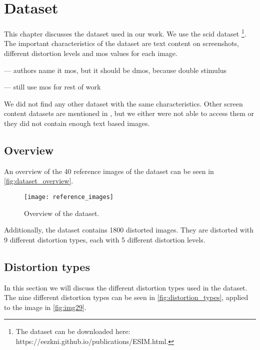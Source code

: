 \chapter{Dataset}
\label{chap:dataset}
This chapter discusses the dataset used in our work. We use the \gls{scid} dataset \cite{ni_esim_2017}\footnote{The dataset can be downloaded here: https://eezkni.github.io/publications/ESIM.html.}.
The important characteristics of the dataset are text content on screenshots, different distortion levels and \gls{mos} values for each image.

--- authors name it mos, but it should be dmos, because double stimulus \cite{mos_dmos_1993}

--- still use mos for rest of work

We did not find any other dataset with the same characteristics.
Other screen content datasets are mentioned in \cite{iqa_survey_2020}, but we either were not able to access them or they did not contain enough text based images.

\section{Overview}
\label{sec:dataset_overview}
An overview of the 40 reference images of the dataset can be seen in \autoref{fig:dataset_overview}.

\begin{figure}[h]
    \centering
    \texttt{[image: reference\_images]}
    \caption{Overview of the dataset.}
    \label{fig:dataset_overview}
\end{figure}

Additionally, the dataset contains 1800 distorted images.
They are distorted with 9 different distortion types, each with 5 different distortion levels.

\section{Distortion types}
\label{sec:dataset_distortion_types}

In this section we will discuss the different distortion types used in the dataset.
The nine different distortion types can be seen in \autoref{fig:distortion_types}, applied to the image in \autoref{fig:img29}.


